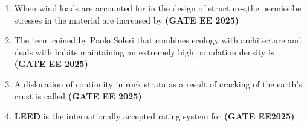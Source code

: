 \documentclass[journal,12pt,onecolumn]{IEEEtran}
\theoremstyle{remark}
\begin{document}
\begin{enumerate}
\begin{enumerate}
\end{enumerate}
\item  When wind loads are accounted for in the design of structures,the permissibe stresses in the material are increased by \hfill \textbf{(GATE EE 2025)}
\begin{enumerate}
\end{enumerate}
\item The term coined by Paolo Soleri that combines ecology with architecture and deals with habits maintaining an extremely high population density is \hfill \textbf{(GATE EE 2025)}
\begin{enumerate}
\end{enumerate}
\item A dislocation of continuity in rock strata as a result of cracking of the earth's crust is called \hfill \textbf{(GATE EE 2025)}
\begin{enumerate}
\end{enumerate}
\item \textbf{LEED} is the internationally accepted rating system for \hfill \textbf{(GATE EE2025)}
\begin{enumerate}
\end{enumerate}
\end{enumerate}
\end{document}
